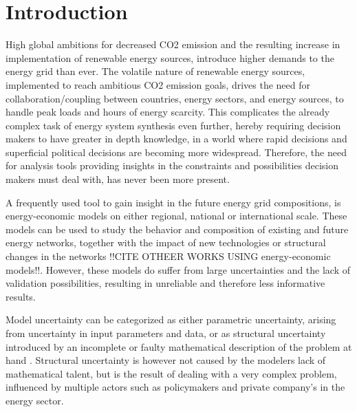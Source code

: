 
\chapter{Introduction}


High global ambitions for decreased CO2 emission and the resulting increase in implementation of renewable energy sources, introduce higher demands to the energy grid than ever. The volatile nature of renewable energy sources, implemented to reach ambitious CO2 emission goals, drives the need for collaboration/coupling between countries, energy sectors, and energy sources, to handle peak loads and hours of energy scarcity. This complicates the already complex task of energy system synthesis even further, hereby requiring decision makers to have greater in depth knowledge, in a world where rapid decisions and superficial political decisions are becoming more widespread. Therefore, the need for analysis tools providing insights in the constraints and possibilities decision makers must deal with, has never been more present.  

A frequently used tool to gain insight in the future energy grid compositions, is energy-economic models on either regional, national or international scale. These models can be used to study the behavior and composition of existing and future energy networks, together with the impact of new technologies or structural changes in the networks \cite{Gorm_impact_of_CO2_PYPSA} !!CITE OTHEER WORKS USING energy-economic models!!. 
However, these models do suffer from large uncertainties and the lack of validation possibilities, resulting in unreliable and therefore less informative results. 

Model uncertainty can be categorized as either parametric uncertainty, arising from uncertainty in input parameters and data, or as structural uncertainty introduced by an incomplete or faulty mathematical description of the problem at hand \cite{DeCarolis_MGA} . Structural uncertainty is however not caused by the modelers lack of mathematical talent, but is the result of dealing with a very complex problem, influenced by multiple actors such as policymakers and private company's in the energy sector. 


